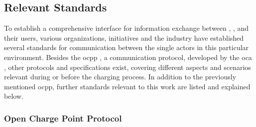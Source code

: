 \subsection{Relevant Standards}
\label{ch:Fundamentals:sec:Electric Mobility:ssec:Relevant Standards}

To establish a comprehensive interface for information exchange between , , and their users, various organizations, initiatives and the industry have established several standards for communication between the single actors in this particular environment.
Besides the \acrfull{ocpp} \cite{noauthor_ocpp_nodate}, a communication protocol, developed by the \acrfull{oca} \cite{noauthor_open_nodate}, other protocols and specifications exist, covering different aspects and scenarios relevant during or before the charging process.
In addition to the previously mentioned \acrshort{ocpp}, further standards relevant to this work are listed and explained below.

\subsubsection{Open Charge Point Protocol}
\label{ch:Fundamentals:sec:Electric Mobility:ssec:Relevant Standards:sssec:OCPP}

